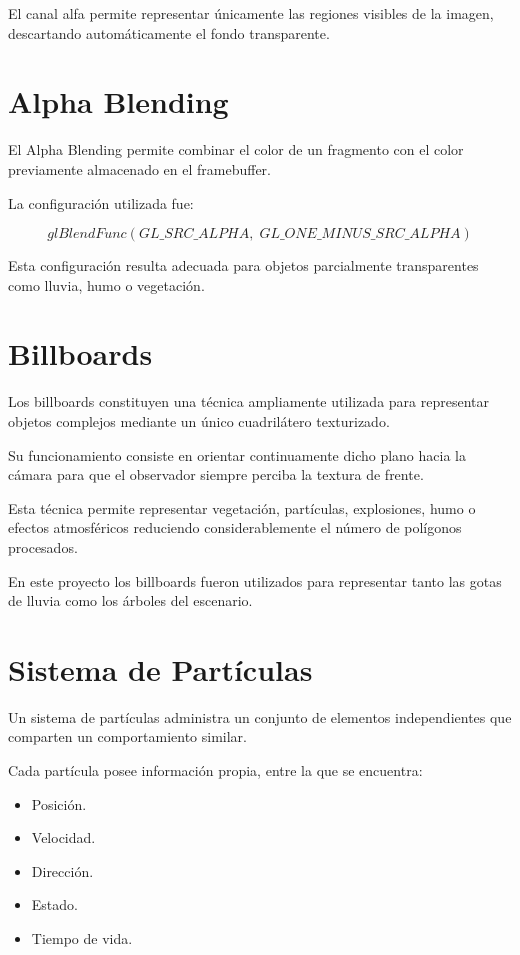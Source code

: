 El canal alfa permite representar únicamente las regiones visibles de la imagen, descartando automáticamente el fondo transparente.

\section{Alpha Blending}

El Alpha Blending permite combinar el color de un fragmento con el color previamente almacenado en el framebuffer.

La configuración utilizada fue:

\[
glBlendFunc(GL\_SRC\_ALPHA,\;GL\_ONE\_MINUS\_SRC\_ALPHA)
\]

Esta configuración resulta adecuada para objetos parcialmente transparentes como lluvia, humo o vegetación.

\section{Billboards}

Los billboards constituyen una técnica ampliamente utilizada para representar objetos complejos mediante un único cuadrilátero texturizado.

Su funcionamiento consiste en orientar continuamente dicho plano hacia la cámara para que el observador siempre perciba la textura de frente.

Esta técnica permite representar vegetación, partículas, explosiones, humo o efectos atmosféricos reduciendo considerablemente el número de polígonos procesados.

En este proyecto los billboards fueron utilizados para representar tanto las gotas de lluvia como los árboles del escenario.

\section{Sistema de Partículas}

Un sistema de partículas administra un conjunto de elementos independientes que comparten un comportamiento similar.

Cada partícula posee información propia, entre la que se encuentra:

\begin{itemize}
\item Posición.
\item Velocidad.
\item Dirección.
\item Estado.
\item Tiempo de vida.
\end{itemize}

